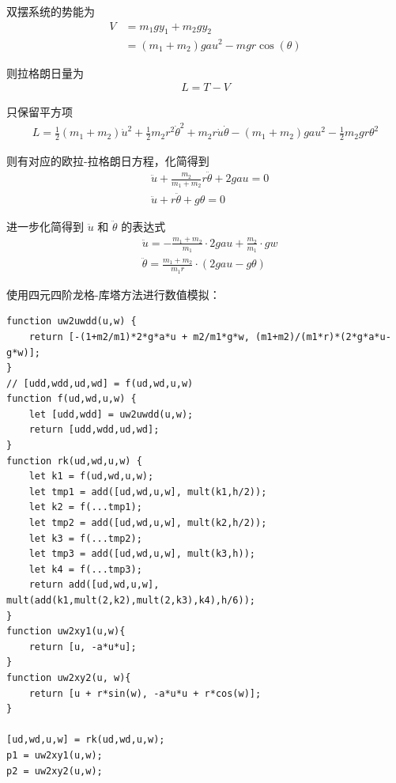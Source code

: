 \documentclass[a4paper, 12pt]{article}
\begin{document}
\begin{itemize}[leftmargin=2em, label={}]
双摆系统的势能为
\begin{align*}
V &= m_1 g y_1 + m_2 g y_2 \\
  &= (m_1+m_2)gau^2-mgr\cos(\theta)
\end{align*}

则拉格朗日量为
\begin{align*}
L = T - V
\end{align*}

只保留平方项
\begin{align*}
L = \frac{1}{2} (m_1+m_2) \dot{u}^2 + \frac{1}{2}m_2r^2\dot{\theta}^2 + m_2r\dot{u}\dot{\theta} - (m_1+m_2)gau^2 - \frac{1}{2} m_2 g r \theta^2
\end{align*}

则有对应的欧拉-拉格朗日方程，化简得到
\begin{align*}
& \ddot{u} + \frac{m_2}{m_1+m_2}r\ddot{\theta}+2gau=0 \\
& \ddot{u}+r\ddot{\theta} + g\theta=0
\end{align*}

进一步化简得到 $\ddot{u}$ 和 $\ddot{\theta}$ 的表达式
\begin{align*}
&\ddot{u} = -\frac{m_1+m_2}{m_1}\cdot 2gau+\frac{m_2}{m_1}\cdot gw \\
&\ddot{\theta} = \frac{m_1+m_2}{m_1r} \cdot (2gau-g\theta)
\end{align*}

\vspace{0.5\baselineskip}

使用四元四阶龙格-库塔方法进行数值模拟：
\vspace{\baselineskip}

\begin{lstlisting}[style=myC]
function uw2uwdd(u,w) {
    return [-(1+m2/m1)*2*g*a*u + m2/m1*g*w, (m1+m2)/(m1*r)*(2*g*a*u-g*w)];
}
// [udd,wdd,ud,wd] = f(ud,wd,u,w)
function f(ud,wd,u,w) {
    let [udd,wdd] = uw2uwdd(u,w);
    return [udd,wdd,ud,wd];
}
function rk(ud,wd,u,w) {
    let k1 = f(ud,wd,u,w);
    let tmp1 = add([ud,wd,u,w], mult(k1,h/2));
    let k2 = f(...tmp1);
    let tmp2 = add([ud,wd,u,w], mult(k2,h/2));
    let k3 = f(...tmp2);
    let tmp3 = add([ud,wd,u,w], mult(k3,h));
    let k4 = f(...tmp3);
    return add([ud,wd,u,w], mult(add(k1,mult(2,k2),mult(2,k3),k4),h/6));
}
function uw2xy1(u,w){
    return [u, -a*u*u];
}
function uw2xy2(u, w){
    return [u + r*sin(w), -a*u*u + r*cos(w)];
}

[ud,wd,u,w] = rk(ud,wd,u,w);
p1 = uw2xy1(u,w);
p2 = uw2xy2(u,w);
\end{lstlisting}
\end{itemize}
\end{document}
